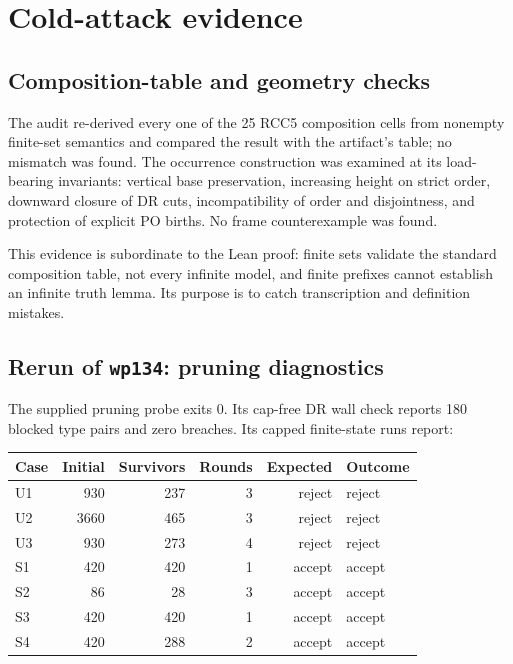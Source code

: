 \documentclass[11pt]{article}
\newcommand{\code}[1]{\texttt{#1}}
\begin{document}
\section{Cold-attack evidence}

\subsection{Composition-table and geometry checks}

The audit re-derived every one of the 25 RCC5 composition cells from nonempty finite-set
semantics and compared the result with the artifact's table; no mismatch was found.
The occurrence construction was examined at its load-bearing invariants: vertical
base preservation, increasing height on strict order, downward closure of DR cuts,
incompatibility of order and disjointness, and protection of explicit PO births.
No frame counterexample was found.

This evidence is subordinate to the Lean proof: finite sets validate the standard
composition table, not every infinite model, and finite prefixes cannot establish an
infinite truth lemma. Its purpose is to catch transcription and definition mistakes.

\subsection{Rerun of \code{wp134}: pruning diagnostics}

The supplied pruning probe exits 0. Its cap-free DR wall check reports 180 blocked
type pairs and zero breaches. Its capped finite-state runs report:

\begin{center}
\renewcommand{\arraystretch}{1.18}
\begin{tabular}{lrrrrl}
\toprule
Case & Initial & Survivors & Rounds & Expected & Outcome \\
\midrule
U1 & 930 & 237 & 3 & reject & reject \\
U2 & 3660 & 465 & 3 & reject & reject \\
U3 & 930 & 273 & 4 & reject & reject \\
S1 & 420 & 420 & 1 & accept & accept \\
S2 & 86 & 28 & 3 & accept & accept \\
S3 & 420 & 420 & 1 & accept & accept \\
S4 & 420 & 288 & 2 & accept & accept \\
\bottomrule
\end{tabular}
\end{center}
\end{document}
